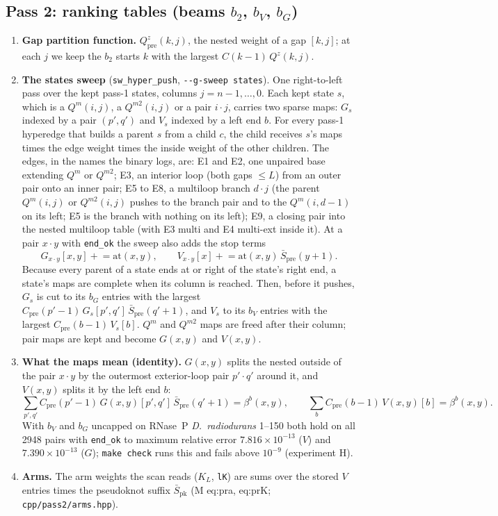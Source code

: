 \documentclass[11pt]{article}
\begin{document}
\subsection*{Pass 2: ranking tables (beams $b_2$, $b_V$, $b_G$)}
\begin{enumerate}[leftmargin=*]
\item \textbf{Gap partition function.} $Q^z_{\mathrm{pre}}(k,j)$, the nested weight of a gap $[k,j]$; at each $j$ we keep the $b_2$ starts $k$ with the largest $C(k-1)\,Q^z(k,j)$.
\item \textbf{The states sweep} (\texttt{sw\_hyper\_push}, \texttt{-{}-g-sweep states}). One right-to-left pass over the kept pass-1 states, columns $j=n-1,\dots,0$. Each kept state $s$, which is a $Q^m(i,j)$, a $Q^{m2}(i,j)$ or a pair $i\cdot j$, carries two sparse maps: $G_s$ indexed by a pair $(p',q')$ and $V_s$ indexed by a left end $b$. For every pass-1 hyperedge that builds a parent $s$ from a child $c$, the child receives $s$'s maps times the edge weight times the inside weight of the other children. The edges, in the names the binary logs, are: E1 and E2, one unpaired base extending $Q^m$ or $Q^{m2}$; E3, an interior loop (both gaps $\le L$) from an outer pair onto an inner pair; E5 to E8, a multiloop branch $d\cdot j$ (the parent $Q^m(i,j)$ or $Q^{m2}(i,j)$ pushes to the branch pair and to the $Q^m(i,d-1)$ on its left; E5 is the branch with nothing on its left); E9, a closing pair into the nested multiloop table (with E3 multi and E4 multi-ext inside it). At a pair $x\cdot y$ with \texttt{end\_ok} the sweep also adds the stop terms
\[
G_{x\cdot y}[x,y]\mathrel{+}=\mathrm{at}(x,y),\qquad V_{x\cdot y}[x]\mathrel{+}=\mathrm{at}(x,y)\,\bar S_{\mathrm{pre}}(y+1).
\]
Because every parent of a state ends at or right of the state's right end, a state's maps are complete when its column is reached. Then, before it pushes, $G_s$ is cut to its $b_G$ entries with the largest $C_{\mathrm{pre}}(p'-1)\,G_s[p',q']\,\bar S_{\mathrm{pre}}(q'+1)$, and $V_s$ to its $b_V$ entries with the largest $C_{\mathrm{pre}}(b-1)\,V_s[b]$. $Q^m$ and $Q^{m2}$ maps are freed after their column; pair maps are kept and become $G(x,y)$ and $V(x,y)$.
\item \textbf{What the maps mean (identity).} $G(x,y)$ splits the nested outside of the pair $x\cdot y$ by the outermost exterior-loop pair $p'\cdot q'$ around it, and $V(x,y)$ splits it by the left end $b$:
\[
\sum_{p',q'}C_{\mathrm{pre}}(p'-1)\,G(x,y)[p',q']\,\bar S_{\mathrm{pre}}(q'+1)=\beta^b(x,y),\qquad
\sum_{b}C_{\mathrm{pre}}(b-1)\,V(x,y)[b]=\beta^b(x,y).
\]
With $b_V$ and $b_G$ uncapped on RNase~P \emph{D.~radiodurans} 1--150 both hold on all 2948 pairs with \texttt{end\_ok} to maximum relative error $7.816\times10^{-13}$ ($V$) and $7.390\times10^{-13}$ ($G$); \texttt{make check} runs this and fails above $10^{-9}$ (experiment H).
\item \textbf{Arms.} The arm weights the scan reads ($K_L$, \texttt{lK}) are sums over the stored $V$ entries times the pseudoknot suffix $\bar S_{\mathrm{pk}}$ (M eq:pra, eq:prK; \texttt{cpp/pass2/arms.hpp}).
\end{enumerate}
\end{document}
